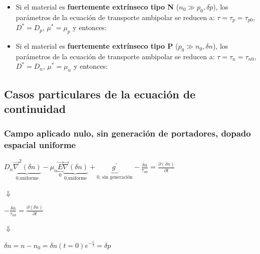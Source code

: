 \documentclass[oneside]{book}
\numberwithin{equation}{section}
\numberwithin{figure}{section}
\numberwithin{table}{section}
\begin{document}
			\begin{itemize}
			\item Si el material es \textbf{fuertemente extrínseco tipo N} ($n_0 \gg p_0,\delta p$), los parámetros de la ecuación de transporte ambipolar se reducen a: $\tau=\tau_p=\tau_{p0}$, $D^*=D_p$, $\mu^*=\mu_p$ y entonces:\\
			
				\begin{center}
			\end{center}	
			\item Si el material es \textbf{fuertemente extrínseco tipo P} ($p_0 \gg n_0,\delta n$), los parámetros de la ecuación de transporte ambipolar se reducen a: $\tau=\tau_n=\tau_{n0}$, $D^*=D_n$, $\mu^*=\mu_n$ y entonces:\\
			
				\begin{center}
			\end{center}
	\end{itemize}
	
	
			\subsection{Casos particulares de la ecuación de continuidad}
		
				\subsubsection{Campo aplicado nulo, sin generación de portadores, dopado espacial uniforme}	
				
					\begin{center}
						$\displaystyle D_n\underbrace{\vec{\nabla}^2(\delta n)}_{\text{0,uniforme}}-\mu_n\underbrace{\vec{E}}_{\text{0}}\underbrace{\vec{\nabla} (\delta n)}_{\text{0,uniforme}}+\underbrace{g^\prime}_{\text{0, sin generación}} -\frac{\delta n}{\tau_{n0}}=\frac{\partial (\delta n)}{\partial t}$
					\end{center}
					\begin{center}
						$\Downarrow$
					\end{center}
					\begin{center}
						$\displaystyle  -\frac{\delta n}{\tau_{n0}}=\frac{\partial (\delta n)}{\partial t}$
					\end{center}
					\begin{center}
						$\Downarrow$
					\end{center}
					\begin{center}
						$\displaystyle \delta n=n-n_0=\delta n(t=0)e^{-\frac{t}{\tau}}=\delta p$
					\end{center}
	
\end{document}

